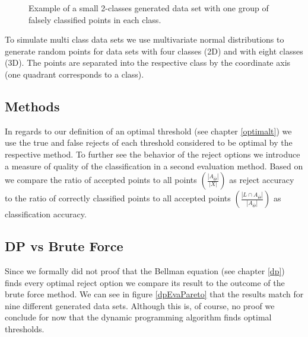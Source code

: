 \begin{figure}[!htbp]
\centering
\caption{Example of a small 2-classes generated data set with one group of falsely classified points in each class.}
\label{dataset}
\end{figure}

To simulate multi class data sets we use multivariate normal distributions to generate random points for data sets with four classes (2D) and with eight classes (3D). The points are separated into the respective class by the coordinate axis (one quadrant corresponds to a class).

\subsection{Methods}
In regards to our definition of an optimal threshold (see chapter \ref{optimalt}) we use the true and false rejects of each threshold considered to be optimal by the respective method. To further see the behavior of the reject options we introduce a measure of quality of the classification in a second evaluation method. Based on \cite{Nad:2010} we compare the ratio of accepted points to all points $ \left( \frac{\left|A_{\bar{\Theta}}\right|}{|X|}\right) $ as reject accuracy to the ratio of correctly classified points to all accepted points $ \left(\frac{\left|L \cap A_{\bar{\Theta}}\right|}{\left|A_{\bar{\Theta}}\right|}\right) $ as classification accuracy.


\subsection{DP vs Brute Force}
\label{DPvsBF}
Since we formally did not proof that the Bellman equation (see chapter \ref{dp}) finds every optimal reject option we compare its result to the outcome of the brute force method. We can see in figure \ref{dpEvaPareto} that the results match for nine different generated data sets. Although this is, of course, no proof we conclude for now that the dynamic programming algorithm finds optimal thresholds.


